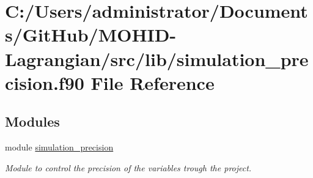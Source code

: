 \hypertarget{simulation__precision_8f90}{}\section{C\+:/\+Users/administrator/\+Documents/\+Git\+Hub/\+M\+O\+H\+I\+D-\/\+Lagrangian/src/lib/simulation\+\_\+precision.f90 File Reference}
\label{simulation__precision_8f90}
\subsection*{Modules}
\begin{DoxyCompactItemize}
\item 
module \mbox{\hyperlink{namespacesimulation__precision}{simulation\+\_\+precision}}
\begin{DoxyCompactList}\small\item\em Module to control the precision of the variables trough the project. \end{DoxyCompactList}\end{DoxyCompactItemize}
